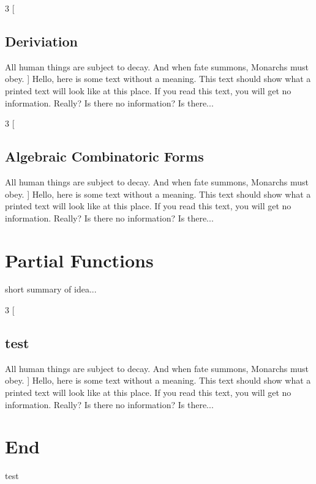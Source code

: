 \documentclass[12pt, letterpaper, twosided]{article}
\begin{document}
	\begin{multicols}{3}
[
	\subsection{Deriviation}
All human things are subject to decay. And when fate summons, Monarchs must obey.
]
\hspace{0.5cm}Hello, here is some text without a meaning.  This text should show what 
a printed text will look like at this place.
If you read this text, you will get no information.  Really?  Is there 
no information?  Is there...
	\end{multicols}


	\begin{multicols}{3}
[
	\subsection{Algebraic Combinatoric Forms}
All human things are subject to decay. And when fate summons, Monarchs must obey.
]
\hspace{0.5cm}Hello, here is some text without a meaning.  This text should show what 
a printed text will look like at this place.
If you read this text, you will get no information.  Really?  Is there 
no information?  Is there...
	\end{multicols}



\newpage
\section{Partial Functions}%
\hspace{0.5cm}short summary of idea...

	\begin{multicols}{3}
[
	\subsection{test}
All human things are subject to decay. And when fate summons, Monarchs must obey.
]
\hspace{0.5cm}Hello, here is some text without a meaning.  This text should show what 
a printed text will look like at this place.
If you read this text, you will get no information.  Really?  Is there 
no information?  Is there...
	\end{multicols}



\newpage
\section*{End}%
\hspace{0.5cm}test




	
\end{document}
